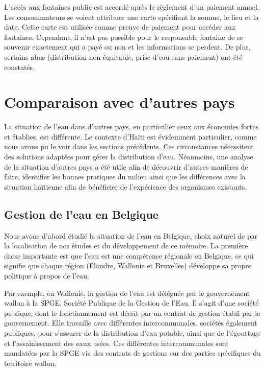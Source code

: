 \documentclass{EPL-master-thesis-covers-FR}
\begin{document}
    			L'accès aux fontaines public est accordé après le règlement d'un paiement annuel. Les consommateurs se voient attribuer une carte spécifiant la somme, le lieu et la date. Cette carte est utilisée comme preuve de paiement pour accéder aux fontaines. Cependant, il n'est pas possible pour le responsable fontaine de se souvenir exactement qui a payé ou non et les informations se perdent. De plus, certains abus (distribution non-équitable, prise d'eau sans paiement) ont été constatés.


		\section{Comparaison avec d'autres pays}

			La situation de l'eau dans d'autres pays, en particulier ceux aux économies fortes et établies, est différente. Le contexte d'Haïti est évidemment particulier, comme nous avons pu le voir dans les sections précédents. Ces circonstances nécessitent des solutions adaptées pour gérer la distribution d'eau. Néanmoins, une analyse de la situation d'autres pays a été utile afin de découvrir d'autres manières de faire, identifier les bonnes pratiques du milieu ainsi que les différences avec la situation haïtienne afin de bénéficier de l'expérience des organismes existants.

			\subsection*{Gestion de l'eau en Belgique}

				Nous avons d'abord étudié la situation de l'eau en Belgique, choix naturel de par la localisation de nos études et du développement de ce mémoire. La première chose importante est que l'eau est une compétence régionale en Belgique, ce qui signifie que chaque région (Flandre, Wallonie et Bruxelles) développe sa propre politique à propos de l'eau.

				Par exemple, en Wallonie, la gestion de l'eau est déléguée par le gouvernement wallon à la SPGE, Société Publique de la Gestion de l'Eau. Il s'agit d'une société publique, dont le fonctionnement est décrit par un contrat de gestion établi par le gouvernement. Elle travaille avec différentes intercommunales, sociétés également publiques, pour s'assurer de la distribution d'eau potable, ainsi que de l'égouttage et l'assainissement des eaux usées. Ces différentes intercommunales sont mandatées par la SPGE via des contrats de gestions sur des parties spécifiques du territoire wallon.
\end{document}
